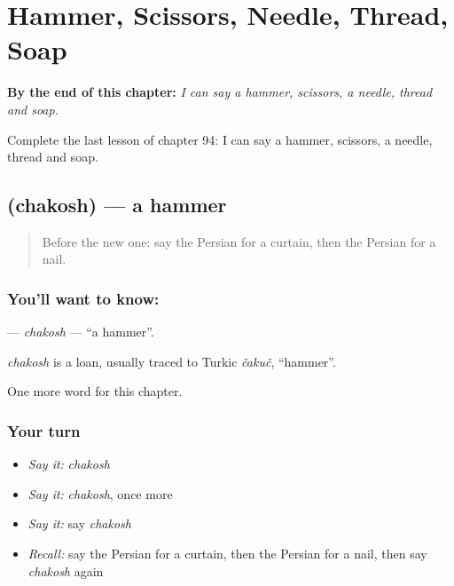 
\chapter{Hammer, Scissors, Needle, Thread, Soap}
\label{ch:fa-hammer-scissors-needle-thread-soap}

\begin{chapteropening}
\textbf{By the end of this chapter:} \emph{I can say a hammer, scissors, a needle, thread and soap.}

Complete the last lesson of chapter 94: I can say a hammer, scissors, a needle, thread and soap.
\end{chapteropening}

\section[\texorpdfstring{\fa{چکش} (chakosh)}{چکش (chakosh)}]{ (chakosh) — a hammer}

\label{lesson:FA-C94-chakosh}



\begin{quote}
Before the new one: say the Persian for a curtain, then the Persian for a nail.
\end{quote}

\subsection*{You'll want to know: }
\textbf{} — \emph{chakosh} — \textquotedblleft{}a hammer\textquotedblright{}.

\begin{cousinweb}
\emph{chakosh} is a loan, usually traced to Turkic \emph{čakuč}, \textquotedblleft{}hammer\textquotedblright{}.
\end{cousinweb}

\begin{grammarlens}[title={What you've built}]
One more word for this chapter.
\end{grammarlens}

\subsection*{Your turn}
\begin{itemize}
\raggedright
  \item \emph{Say it:} \emph{chakosh}
  \item \emph{Say it:} \emph{chakosh}, once more
  \item \emph{Say it:} say \emph{chakosh}
  \item \emph{Recall:} say the Persian for a curtain, then the Persian for a nail, then say \emph{chakosh} again
\end{itemize}

